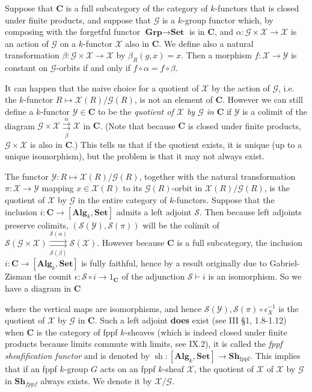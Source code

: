 \documentclass[oneside,11pt]{amsart}
\newcommand{\bC}{\ensuremath{\textbf{C}}}
\newcommand{\bSet}{\ensuremath{\textbf{Set}}}
\newcommand{\bAlg}{\ensuremath{\textbf{Alg}}}
\newcommand{\bGrp}{\ensuremath{\textbf{Grp}}}
\newcommand{\bSh}{\ensuremath{\textbf{Sh}}}
\newcommand{\mX}{\ensuremath{\mathcal{X}}}
\newcommand{\mY}{\ensuremath{\mathcal{Y}}}
\newcommand{\mG}{\ensuremath{\mathcal{G}}}
\newcommand{\mS}{\ensuremath{\mathcal{S}}}
\newcommand{\sh}{\operatorname{sh}}
\theoremstyle{definition}
\newtheorem{proof techniques}{Proof Techniques}
\begin{document}
Suppose that $\bC$ is a full subcategory of the category of $k$-functors that is closed under finite products, and suppose that $\mG$ is a $k$-group functor which, by composing with the forgetful functor $\bGrp \to \bSet$ is in $\bC$, and $\alpha : \mG \times \mX \to \mX$ is an action of $\mG$ on a $k$-functor $\mX$ also in $\bC$. We define also a natural transformation $\beta : \mG \times \mX \to \mX$ by $\beta_R(g , x) = x$. Then a morphism $f: \mX \to \mY$ is constant on $\mG$-orbits if and only if $f \circ  \alpha = f \circ \beta$. 

It can happen that the naive choice for a quotient of $\mX$ by the action of $\mG$, i.e. the $k$-functor $R \mapsto \mX(R) / \mG(R)$, is not an element of $\bC$. However we can still define a $k$-functor $\mY \in \bC$ to be the \emph{quotient of $\mX$ by $\mG$ in} $\bC$ if $\mY$ is a colimit of the diagram $\mG \times \mX \underset{\beta}{\overset{\alpha}{\rightrightarrows}} \mX$ in $\bC$. (Note that because $\bC$ is closed under finite products, $\mG \times \mX$ is also in $\bC$.) This tells us that if the quotient exists, it is unique (up to a unique isomorphism), but the problem is that it may not always exist. 

The functor $\mY : R \mapsto \mX(R) / \mG(R)$, together with the natural transformation $\pi : \mX \to \mY$ mapping $x \in \mX(R)$ to its $\mG(R)$-orbit in $\mX(R) / \mG(R)$, is the quotient of $\mX$ by $\mG$ in the entire category of $k$-functors. Suppose that the inclusion $i : \bC \to [\bAlg_k, \bSet]$ admits a left adjoint $\mS$. Then because left adjoints preserve colimits, $( \mS(\mY) , \mS(\pi) )$ will be the colimit of $\mS(\mG \times \mX )\underset{\mS(\beta)}{\overset{\mS(\alpha)}{\rightrightarrows}} \mS(\mX)$. However because $\bC$ is a full subcategory, the inclusion $i : \bC \to [\bAlg_k, \bSet]$ is fully faithful, hence by a result originally due to Gabriel-Zisman \cite{gabriel-zisman2012} the counit $\epsilon: \mS \circ i \to 1_\bC$ of the adjunction $\mS \vdash i$ is an isomorphism. So we have a diagram in $\bC$
\begin{center}
\end{center}
where the vertical maps are isomorphisms, and hence $\mS(\mY) , \mS(\pi) \circ \epsilon_X^{-1}$ is the quotient of $\mX$ by $\mG$ in $\bC$. Such a left adjoint \textbf{does} exist (see \cite{demazure-gabriel1970} III \S 1, 1.8-1.12) when $\bC$ is the category of fppf $k$-sheaves (which is indeed closed under finite products because limits commute with limits, see \cite{maclane2013} IX.2), it is called the \emph{fppf sheafification functor} and is denoted by $\sh : [\bAlg_k , \bSet] \to \bSh_{\text{fppf}}$. This implies that if an fppf $k$-group $G$ acts on an fppf $k$-sheaf $\mX$, the quotient of $\mX$ of $\mX$ by $\mG$ in $\bSh_{fppf}$ always exists. We denote it by $\mX / \mG$. 
\end{document}
